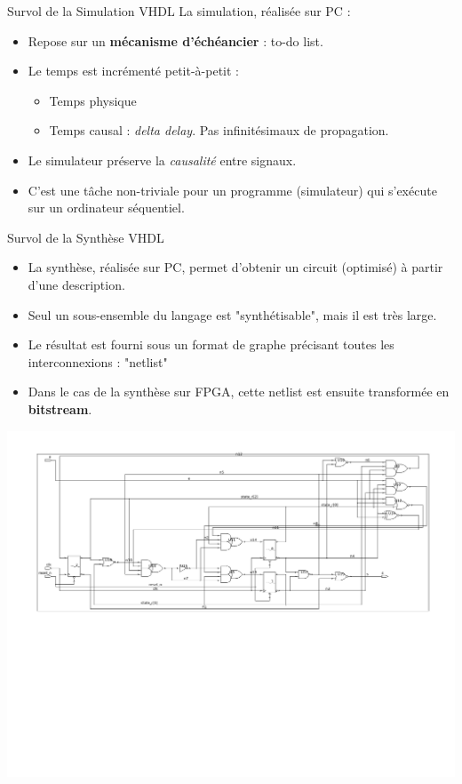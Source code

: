\documentclass[xcolor=table]{beamer} %
\begin{document}
\begin{frame}{Survol de la Simulation VHDL}
  La simulation, réalisée sur PC :
  \begin{itemize}
    \item Repose sur un \textbf{mécanisme d'échéancier} : to-do list.
    \item Le temps est incrémenté petit-à-petit :
    \begin{itemize}
      \item Temps physique
      \item Temps causal : {\it delta delay}. Pas infinitésimaux de propagation.
    \end{itemize}
    \item Le simulateur préserve la {\it causalité} entre signaux.
    \item C'est une tâche non-triviale pour un programme (simulateur) qui s'exécute sur un ordinateur séquentiel.
  \end{itemize}
\end{frame}

\begin{frame}{Survol de la Synthèse VHDL}
  \begin{itemize}
    \item La synthèse, réalisée sur PC, permet d'obtenir un circuit (optimisé) à partir d'une description.
    \item Seul un sous-ensemble du langage est "synthétisable", mais il est très large.
    \item Le résultat est fourni sous un format de graphe précisant toutes les interconnexions : "netlist"
    \item Dans le cas de la synthèse sur FPGA, cette netlist est ensuite transformée en \textbf{bitstream}.
  \end{itemize}
  \includegraphics[width=\textwidth]{Schematic.pdf}
\end{frame}
\end{document}
